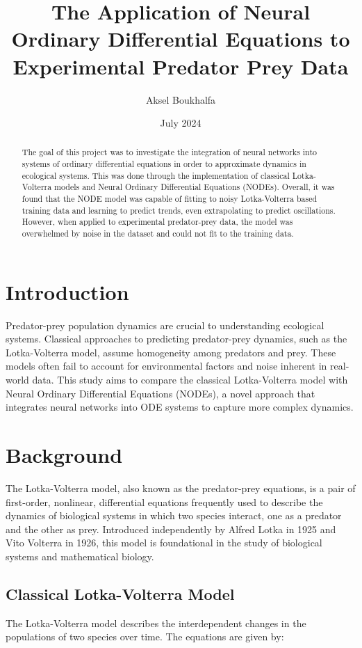 \documentclass[twocolumn]{article}
\title{The Application of Neural Ordinary Differential Equations to Experimental Predator Prey Data}
\author{Aksel Boukhalfa}
\date{July 2024}
\begin{document}
\maketitle

\begin{abstract}
The goal of this project was to investigate the integration of neural networks into systems of ordinary differential equations in order to approximate dynamics in ecological systems. This was done through the implementation of classical Lotka-Volterra models and Neural Ordinary Differential Equations (NODEs). Overall, it was found that the NODE model was capable of fitting to noisy Lotka-Volterra based training data and learning to predict trends, even extrapolating to predict oscillations. However, when applied to experimental predator-prey data, the model was overwhelmed by noise in the dataset and could not fit to the training data.
\end{abstract}

\section{Introduction}
Predator-prey population dynamics are crucial to understanding ecological systems. Classical approaches to predicting predator-prey dynamics, such as the Lotka-Volterra model, assume homogeneity among predators and prey\cite{Lotka1925, Volterra1926}. These models often fail to account for environmental factors and noise inherent in real-world data. This study aims to compare the classical Lotka-Volterra model with Neural Ordinary Differential Equations (NODEs), a novel approach that integrates neural networks into ODE systems to capture more complex dynamics.

\section{Background}

The Lotka-Volterra model, also known as the predator-prey equations, is a pair of first-order, nonlinear, differential equations frequently used to describe the dynamics of biological systems in which two species interact, one as a predator and the other as prey. Introduced independently by Alfred Lotka in 1925 and Vito Volterra in 1926, this model is foundational in the study of biological systems and mathematical biology.

\subsection{Classical Lotka-Volterra Model}
The Lotka-Volterra model describes the interdependent changes in the populations of two species over time. The equations are given by:
\end{document}
